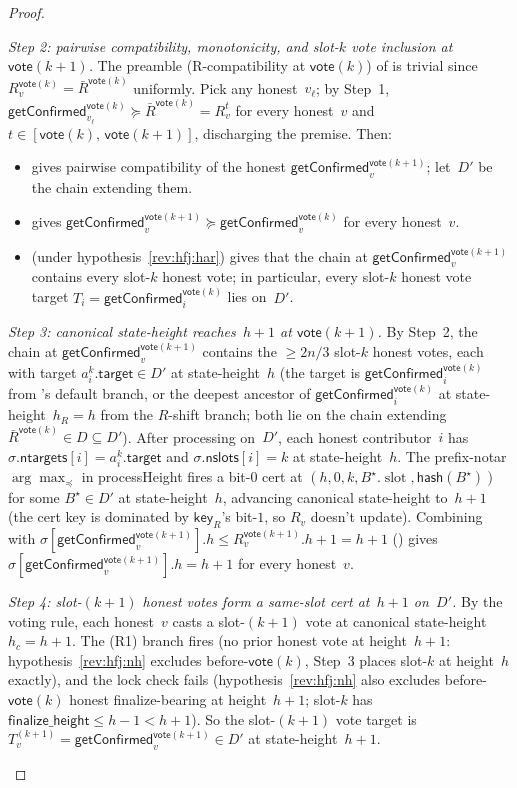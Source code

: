 \ifx\litemode\undefined\documentclass{article}\fi
\newcommand{\slot}[0]{\ensuremath{\operatorname{\mathrm{slot}}}}
\newcommand{\target}{\mathsf{target}}
\newcommand{\finalizeHeight}{\mathsf{finalize\_height}}
\newcommand{\ntargets}{\mathsf{ntargets}}
\newcommand{\nslots}{\mathsf{nslots}}
\newcommand{\hash}{\mathsf{hash}}
\newcommand{\key}{\mathsf{key}}
\newcommand{\vote}{\mathsf{vote}}
\newcommand{\comm}[1]{\bar{#1}}
\newcommand{\processHeight}{\textsf{processHeight}\xspace}
\newcommand{\getConfirmed}{\textsf{getConfirmed}\xspace}
\theoremstyle{plain}
\theoremstyle{definition}
\theoremstyle{remark}
\begin{document}
\begin{proof}
\begin{description}
\emph{Step 2: pairwise compatibility, monotonicity, and slot-$k$ vote inclusion at $\vote(k+1)$.}
The preamble (R-compatibility at $\vote(k)$) of  is trivial since $R_v^{\vote(k)} = \comm{R}^{\vote(k)}$ uniformly. Pick any honest~$v_\ell$; by Step~1, $\getConfirmed_{v_\ell}^{\vote(k)} \succeq \comm{R}^{\vote(k)} = R_v^t$ for every honest~$v$ and $t \in [\vote(k),\, \vote(k+1)]$, discharging the premise. Then:
\begin{itemize}
  \item {} gives pairwise compatibility of the honest $\getConfirmed_v^{\vote(k+1)}$; let~$D'$ be the chain extending them.
  \item {} gives $\getConfirmed_v^{\vote(k+1)} \succeq \getConfirmed_v^{\vote(k)}$ for every honest~$v$.
  \item {} (under hypothesis~\ref{rev:hfj:har}) gives that the chain at $\getConfirmed_v^{\vote(k+1)}$ contains every slot-$k$ honest vote; in particular, every slot-$k$ honest vote target $T_i = \getConfirmed_i^{\vote(k)}$ lies on~$D'$.
\end{itemize}

\emph{Step 3: canonical state-height reaches~$h+1$ at $\vote(k+1)$.}
By Step~2, the chain at $\getConfirmed_v^{\vote(k+1)}$ contains the $\geq 2n/3$ slot-$k$ honest votes, each with target $a^k_i.\target \in D'$ at state-height~$h$ (the target is $\getConfirmed_i^{\vote(k)}$ from 's default branch, or the deepest ancestor of $\getConfirmed_i^{\vote(k)}$ at state-height~$h_R = h$ from the $R$-shift branch; both lie on the chain extending $\comm{R}^{\vote(k)} \in D \subseteq D'$). After processing on~$D'$, each honest contributor~$i$ has $\sigma.\ntargets[i] = a^k_i.\target$ and $\sigma.\nslots[i] = k$ at state-height~$h$. The prefix-notar $\arg\max_\preceq$ in \processHeight{} fires a bit-$0$ cert at $(h, 0, k, B^\star.\slot, \hash(B^\star))$ for some $B^\star \in D'$ at state-height~$h$, advancing canonical state-height to~$h+1$ (the cert key is dominated by $\key_R$'s bit-$1$, so $R_v$ doesn't update). Combining with $\sigma[\getConfirmed_v^{\vote(k+1)}].h \leq R_v^{\vote(k+1)}.h + 1 = h+1$ () gives $\sigma[\getConfirmed_v^{\vote(k+1)}].h = h+1$ for every honest~$v$.

\emph{Step 4: slot-$(k+1)$ honest votes form a same-slot cert at~$h+1$ on~$D'$.}
By the voting rule, each honest~$v$ casts a slot-$(k+1)$ vote at canonical state-height~$h_c = h+1$. The (R1) branch fires (no prior honest vote at height~$h+1$: hypothesis~\ref{rev:hfj:nh} excludes before-$\vote(k)$, Step~3 places slot-$k$ at height~$h$ exactly), and the lock check fails (hypothesis~\ref{rev:hfj:nh} also excludes before-$\vote(k)$ honest finalize-bearing at height~$h+1$; slot-$k$ has $\finalizeHeight \leq h - 1 < h+1$). So the slot-$(k+1)$ vote target is $T_v^{(k+1)} = \getConfirmed_v^{\vote(k+1)} \in D'$ at state-height~$h+1$.


\end{description}
\end{proof}
\end{document}
